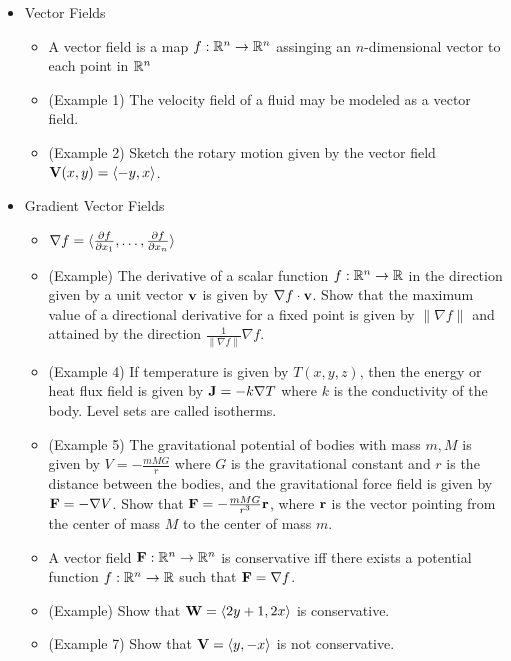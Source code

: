 \documentclass[11pt]{article}
\begin{document}
\begin{itemize}
  \item Vector Fields
    \begin{itemize}
      \item A vector field is a map \(f:\mathbb R^n\to\mathbb R^n\) assinging an
        \(n\)-dimensional vector to each point in \(\mathbb R^n\)
      \item (Example 1) The velocity field of a fluid may be modeled as a
        vector field.
      \item (Example 2) Sketch the rotary motion given by the vector
        field \(\mathbf{V}(x,y)=\langle-y,x\rangle\).
    \end{itemize}
  \item Gradient Vector Fields
    \begin{itemize}
      \item \(\nabla f = \langle\frac{\partial f}{\partial x_1},\dots,\frac{\partial f}{\partial x_n}\rangle\)
      \item (Example) The derivative of a scalar function
        \(f:\mathbb R^n\to \mathbb R\) in the direction given by a unit vector
        \(\mathbf{v}\)
        is given by \(\nabla f\cdot \mathbf{v}\). Show that the maximum value
        of a directional derivative for a fixed point
        is given by \(\|\nabla f\|\)
        and attained by the direction \(\frac{1}{\|\nabla f\|}\nabla f\).
      \item (Example 4) If temperature is given by \(T(x,y,z)\), then the
        energy or heat flux field is given by \(\mathbf{J} = -k\nabla T\) where
        \(k\) is the conductivity of the body. Level sets are called isotherms.
      \item (Example 5) The gravitational potential of bodies with mass \(m,M\)
        is given by \(V=-\frac{mMG}{r}\) where \(G\) is the gravitational
        constant and \(r\) is the distance between the bodies, and the
        gravitational force field is given by \(\mathbf{F}=-\nabla V\).
        Show that \(\mathbf{F} = -\frac{mMG}{r^3}\mathbf{r}\), where \(\mathbf{r}\)
        is the vector pointing from the center of mass \(M\) to the center
        of mass \(m\).
      \item A vector field \(\mathbf{F}:\mathbb R^n\to\mathbb R^n\) is conservative iff
        there exists
        a potential function \(f:\mathbb R^n\to\mathbb R\) such that
        \(\mathbf{F}=\nabla f\).
      \item (Example) Show that \(\mathbf{W}=\langle2y+1,2x\rangle\) is conservative.
      \item (Example 7) Show that \(\mathbf{V}=\langle y,-x\rangle\) is not conservative.

\end{itemize}
\end{itemize}
\end{document}

